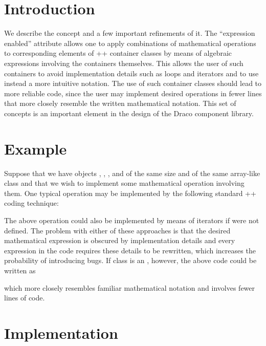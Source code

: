 \documentclass[11pt]{rnote}
\begin{document}
\section{Introduction}

We describe the  concept and 
a few important refinements of it. The ``expression enabled''
attribute allows one to apply combinations of mathematical operations
to corresponding elements of \C++ container classes by means of
algebraic expressions involving the containers themselves. This allows 
the user of such containers to avoid implementation details such as
loops and iterators and to use instead a more intuitive notation. The
use of such container classes should lead to more reliable code, since 
the user may implement desired operations in fewer lines that more
closely resemble the written mathematical notation. This set of
concepts is an important element in the design of the Draco component
library.

\section{Example}

Suppose that we have objects , , , and
 of the same size and of the same array-like class
 and that we wish to implement some mathematical
operation involving them. One typical operation may be implemented by
the following standard \C++ coding technique:

\break
\hspace*{0.25in}

The above operation could also be implemented by means of iterators if 
 were not defined. The problem with either of these
approaches is that the desired mathematical expression is obscured by
implementation details and every expression in the code requires these 
details to be rewritten, which increases the probability of
introducing bugs. If class  is an , however, the above code could be written as


which more closely resembles familiar mathematical notation and
involves fewer lines of code.

\section{Implementation}
\end{document}
